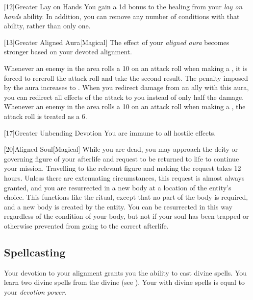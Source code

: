         [12]{Greater Lay on Hands} 
        You gain a \plus1d bonus to the healing from your \textit{lay on hands} ability.
        In addition, you can remove any number of conditions with that ability, rather than only one.

        [13]{Greater Aligned Aura}[Magical]
        The effect of your \textit{aligned aura} becomes stronger based on your devoted alignment.

         Whenever an enemy in the area rolls a 10 on an attack roll when making a , it is forced to rereroll the attack roll and take the second result.
         The penalty imposed by the aura increases to .
         When you redirect damage from an ally with this aura, you can redirect all effects of the attack to you instead of only half the damage.
         Whenever an enemy in the area rolls a 10 on an attack roll when making a , the attack roll is treated as a 6.

        [17]{Greater Unbending Devotion}
        You are immune to all hostile  effects.

        [20]{Aligned Soul}[Magical]
        While you are dead, you may approach the deity or governing figure of your afterlife and request to be returned to life to continue your mission.
        Travelling to the relevant figure and making the request takes 12 hours.
        Unless there are extenuating circumstances, this request is almost always granted, and you are resurrected in a new body at a location of the entity's choice.
        This functions like the  ritual, except that no part of the body is required, and a new body is created by the entity.
        You can be resurrected in this way regardless of the condition of your body, but not if your soul has been trapped or otherwise prevented from going to the correct afterlife.

    \subsection{Spellcasting}

        Your devotion to your alignment grants you the ability to cast divine spells.
        You learn two divine spells from the divine  (see ).
        Your  with divine spells is equal to your \textit{devotion power}.


